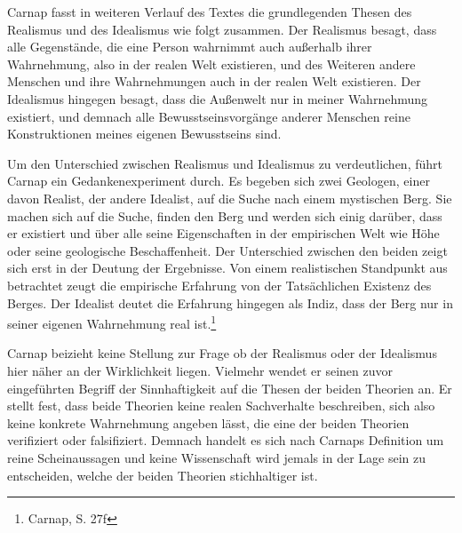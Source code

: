 Carnap fasst in weiteren Verlauf des Textes die grundlegenden Thesen des Realismus und des Idealismus wie folgt zusammen. Der Realismus besagt, dass alle Gegenstände, die eine Person wahrnimmt auch außerhalb ihrer Wahrnehmung, also in der realen Welt existieren, und des Weiteren andere Menschen und ihre Wahrnehmungen auch in der realen Welt existieren. Der Idealismus hingegen besagt, dass die Außenwelt nur in meiner Wahrnehmung existiert, und demnach alle Bewusstseinsvorgänge anderer Menschen reine Konstruktionen meines eigenen Bewusstseins sind. 

Um den Unterschied zwischen Realismus und Idealismus zu verdeutlichen, führt Carnap ein Gedankenexperiment durch. Es begeben sich zwei Geologen, einer davon Realist, der andere Idealist, auf die Suche nach einem mystischen Berg. Sie machen sich auf die Suche, finden den Berg und werden sich einig darüber, dass er existiert und über alle seine Eigenschaften in der empirischen Welt wie Höhe oder seine geologische Beschaffenheit. Der Unterschied zwischen den beiden zeigt sich erst in der Deutung der Ergebnisse. Von einem realistischen Standpunkt aus betrachtet zeugt die empirische Erfahrung von der Tatsächlichen Existenz des Berges. Der Idealist deutet die Erfahrung hingegen als Indiz, dass der Berg nur in seiner eigenen Wahrnehmung real ist.\footnote{Carnap, S. 27f}

Carnap beizieht keine Stellung zur Frage ob der Realismus oder der Idealismus hier näher an der Wirklichkeit liegen. Vielmehr wendet er seinen zuvor eingeführten Begriff der Sinnhaftigkeit auf die Thesen der beiden Theorien an. Er stellt fest, dass beide Theorien keine realen Sachverhalte beschreiben, sich also keine konkrete Wahrnehmung angeben lässt, die eine der beiden Theorien verifiziert oder falsifiziert. Demnach handelt es sich nach Carnaps Definition um reine Scheinaussagen und keine Wissenschaft wird jemals in der Lage sein zu entscheiden, welche der beiden Theorien stichhaltiger ist.

